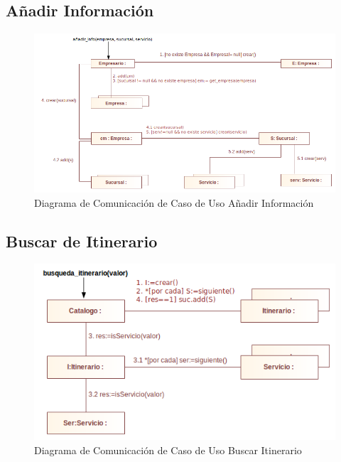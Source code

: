 \documentclass[12pt]{article}
\begin{document}
\subsection{Añadir Información}
\begin{center}\begin{figure}[htp]
\centering
\includegraphics[scale=0.5]{Diagramas/Comunicacion/aniadir_info.png}
\caption{Diagrama de Comunicación de Caso de Uso Añadir Información}
\label{}
\end{figure}\end{center}
\subsection{Buscar de Itinerario}
\begin{center}\begin{figure}[htp]
\centering
\includegraphics[scale=0.60]{Diagramas/Comunicacion/buscar_itinerario.png}
\caption{Diagrama de Comunicación de Caso de Uso Buscar Itinerario}
\label{}
\end{figure}\end{center}
\newpage
\end{document}
